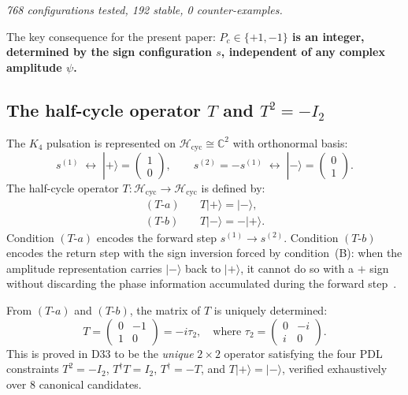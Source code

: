 \documentclass[12pt,a4paper]{article}
\newcommand{\cplu}{|{+}\rangle}
\newcommand{\cmin}{|{-}\rangle}
\newcommand{\Hcycl}{\mathcal{H}_{\mathrm{cyc}}}
\newcommand{\CC}{\mathbb{C}}
\begin{document}
\begin{center}
\textit{768 configurations tested, 192 stable, 0 counter-examples.}
\end{center}

The key consequence for the present paper: \textbf{$P_c \in \{+1,-1\}$ is an integer,
determined by the sign configuration $s$, independent of any complex amplitude $\psi$.}

\subsection{The half-cycle operator \texorpdfstring{$T$}{T} and \texorpdfstring{$T^2 = -I_2$}{T2 = -I2}}
\label{subsec:T}

The $K_4$ pulsation is represented on $\Hcycl \cong \CC^2$ with orthonormal basis:
\begin{equation}
s^{(1)} \;\longleftrightarrow\; \cplu = \begin{pmatrix}1\\0\end{pmatrix}, \qquad
s^{(2)} = -s^{(1)} \;\longleftrightarrow\; \cmin = \begin{pmatrix}0\\1\end{pmatrix}.
\label{eq:basis}
\end{equation}
The half-cycle operator $T : \Hcycl \to \Hcycl$ is defined by:
\begin{align}
(T\text{-}a) &\quad T\cplu = \cmin, \label{eq:Ta} \\
(T\text{-}b) &\quad T\cmin = -\cplu. \label{eq:Tb}
\end{align}
Condition $(T\text{-}a)$ encodes the forward step $s^{(1)} \to s^{(2)}$. Condition
$(T\text{-}b)$ encodes the return step with the sign inversion forced by condition~(B):
when the amplitude representation carries $\cmin$ back to $\cplu$, it cannot do so
with a $+$ sign without discarding the phase information accumulated during the forward
step~\cite{PDL_D33_2026}.

From $(T\text{-}a)$ and $(T\text{-}b)$, the matrix of $T$ is uniquely determined:
\begin{equation}
T = \begin{pmatrix} 0 & -1 \\ 1 & 0 \end{pmatrix} = -i\tau_2,
\quad \text{where } \tau_2 = \begin{pmatrix}0 & -i \\ i & 0\end{pmatrix}.
\label{eq:T_matrix}
\end{equation}
This is proved in D33 to be the \emph{unique} $2\times2$ operator satisfying the four
PDL constraints $T^2 = -I_2$, $T^\dagger T = I_2$, $T^\dagger = -T$, and
$T\cplu = \cmin$, verified exhaustively over 8 canonical candidates.
\end{document}
